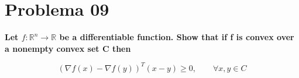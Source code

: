 \section*{Problema 09}

\textbf{Let $f : \mathbb{R}^n \rightarrow \mathbb{R}$ be a differentiable function. Show that if f is convex over a nonempty convex set C then}

\begin{equation*}
    (\nabla f(x)-\nabla f(y))^T (x-y) \geq 0, \qquad \forall x,y \in C
\end{equation*}

